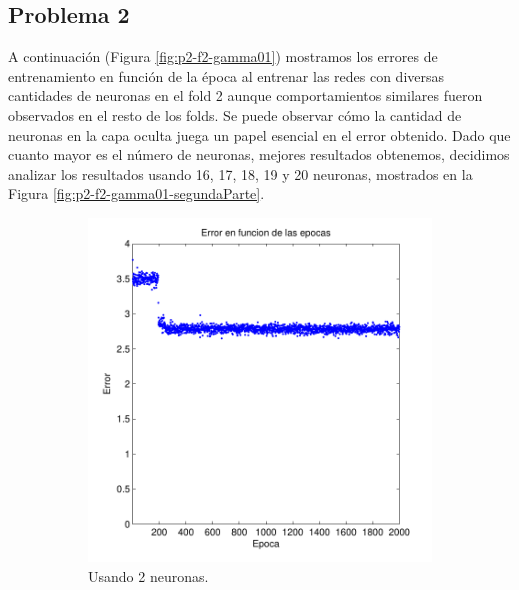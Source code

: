 \documentclass[informe.tex]{subfiles}
\begin{document}
    \subsection{Problema 2}
    
      A continuación (Figura \ref{fig:p2-f2-gamma01}) mostramos los errores de entrenamiento en función de la época al entrenar las redes con diversas cantidades de neuronas en el fold 2 aunque comportamientos similares fueron observados en el resto de los folds. Se puede observar cómo la cantidad de neuronas en la capa oculta juega un papel esencial en el error obtenido. Dado que cuanto mayor es el número de neuronas, mejores resultados obtenemos, decidimos analizar los resultados usando 16, 17, 18, 19 y 20 neuronas, mostrados en la Figura \ref{fig:p2-f2-gamma01-segundaParte}.
      
    \begin{figure}[H]
        \centering
        \begin{subfigure}[b]{0.32\textwidth}
                \includegraphics[width=\textwidth]{graficos/error_fold2_2_binary-regresion_2000_01.pdf}
                \caption{Usando 2 neuronas.}
                \label{fig:d2-f2-2k-01-n2}
        \end{subfigure}
        \begin{subfigure}[b]{0.32\textwidth}

\end{subfigure}
\end{figure}
\end{document}
